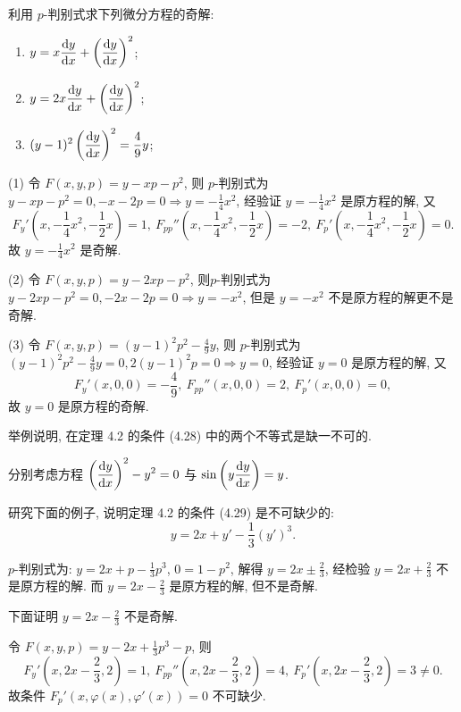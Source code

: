 \begin{exercise}
  利用 $p$-判别式求下列微分方程的奇解:
  \begin{enumerate}[(1)]
  \item $\displaystyle y=x\frac{\mathop{}\!\mathrm{d} y}{\mathop{}\!\mathrm{d} x}+\left(\frac{\mathop{}\!\mathrm{d} y}{\mathop{}\!\mathrm{d} x}\right)^2$;
  \item $\displaystyle y=2x\frac{\mathop{}\!\mathrm{d} y}{\mathop{}\!\mathrm{d} x}+\left(\frac{\mathop{}\!\mathrm{d} y}{\mathop{}\!\mathrm{d} x}\right)^2$;
  \item $\displaystyle (y-1)^2\left(\frac{\mathop{}\!\mathrm{d} y}{\mathop{}\!\mathrm{d} x}\right)^2=\frac{4}{9}y$;
  \end{enumerate}
\end{exercise}

\begin{solution} 
  (1) 令 $F(x,y,p)=y-xp-p^2$, 则 $p$-判别式为
  $y-xp-p^2=0,-x-2p=0\Rightarrow y=-\frac{1}{4}x^2$, 经验证 $y=-\frac{1}{4}x^2$ 是原方程的解, 又
  \[F_y'\left(x,-\frac{1}{4}x^2,-\frac{1}{2}x\right)=1,\:
    F_{pp}''\left(x,-\frac{1}{4}x^2,-\frac{1}{2}x\right)=-2,\:
    F_p'\left(x,-\frac{1}{4}x^2,-\frac{1}{2}x\right)=0.\]
  故 $y=-\frac{1}{4}x^2$ 是奇解.

  (2) 令 $F(x,y,p)=y-2xp-p^2$, 则$p$-判别式为$y-2xp-p^2=0,-2x-2p=0\Rightarrow y=-x^2$,
  但是 $y=-x^2$ 不是原方程的解更不是奇解.

  (3) 令 $F(x,y,p)=(y-1)^2p^2-\frac{4}{9}y$, 
  则 $p$-判别式为 $(y-1)^2p^2-\frac{4}{9}y=0,2(y-1)^2p=0\Rightarrow y=0$, 
  经验证 $y=0$ 是原方程的解, 又
  \[F_y'(x,0,0)=-\frac{4}{9},\: F_{pp}''(x,0,0)=2,\: F_p'(x,0,0)=0,\]
  故 $y=0$ 是原方程的奇解.
\end{solution}



\begin{exercise}
  举例说明, 在定理 4.2 的条件 (4.28) 中的两个不等式是缺一不可的.
\end{exercise}

\begin{solution}  
  分别考虑方程 $\displaystyle\left(\frac{\mathop{}\!\mathrm{d} y}{\mathop{}\!\mathrm{d} x}\right)^2-y^2=0$
  与 $\displaystyle\sin\left(y\frac{\mathop{}\!\mathrm{d} y}{\mathop{}\!\mathrm{d} x}\right)=y$.
\end{solution}



\begin{exercise}
  研究下面的例子, 说明定理 4.2 的条件 (4.29) 是不可缺少的:
  \[y=2x+y'-\frac{1}{3}(y')^3.\]
\end{exercise}

\begin{solution} 
  $p$-判别式为: $y=2x+p-\frac{1}{3}p^3$, $0 = 1-p^2$, 解得 $y = 2x\pm\frac{2}{3}$, 
  经检验 $y=2x+\frac{2}{3}$ 不是原方程的解. 而 $y=2x-\frac{2}{3}$ 是原方程的解, 但不是奇解.

  下面证明 $y = 2x - \frac23$ 不是奇解.

  令 $F(x,y,p) = y-2x+\frac{1}{3}p^3-p$, 则
  \[F_y'\left(x,2x-\frac{2}{3},2\right)=1,\:
    F_{pp}''\left(x,2x-\frac{2}{3},2\right)=4,\:
    F_p'\left(x,2x-\frac{2}{3},2\right)=3\neq 0.\]
  故条件 $F_p'(x,\varphi(x),\varphi'(x))=0$ 不可缺少.
\end{solution}



